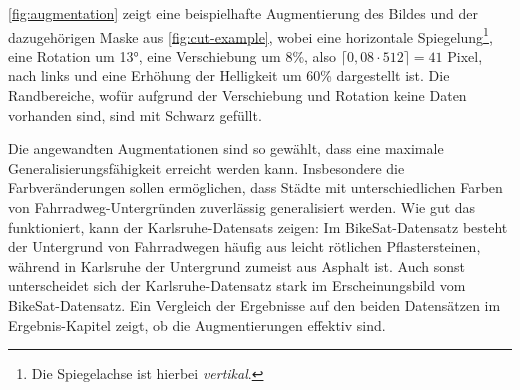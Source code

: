 \autoref{fig:augmentation} zeigt eine beispielhafte Augmentierung des Bildes und der dazugehörigen Maske aus \autoref{fig:cut-example},
wobei eine horizontale Spiegelung\footnote{Die Spiegelachse ist hierbei \textit{vertikal}.},
eine Rotation um 13°, eine Verschiebung um 8\%, also $\lceil 0,08 \cdot 512 \rceil = 41$ Pixel,
nach links und eine Erhöhung der Helligkeit um 60\% dargestellt ist. 
Die Randbereiche, wofür aufgrund der Verschiebung und Rotation keine Daten vorhanden sind, sind mit Schwarz gefüllt. 

Die angewandten Augmentationen sind so gewählt, dass eine maximale Generalisierungsfähigkeit erreicht werden kann. 
Insbesondere die Farbveränderungen sollen ermöglichen, dass Städte mit unterschiedlichen Farben von Fahrradweg-Untergründen 
zuverlässig generalisiert werden. Wie gut das funktioniert, kann der Karlsruhe-Datensats zeigen: Im BikeSat-Datensatz 
besteht der Untergrund von Fahrradwegen häufig aus leicht rötlichen Pflastersteinen, während in Karlsruhe der Untergrund zumeist 
aus Asphalt ist.   
Auch sonst unterscheidet sich der Karlsruhe-Datensatz stark im Erscheinungsbild vom BikeSat-Datensatz. 
Ein Vergleich der Ergebnisse auf den beiden Datensätzen im Ergebnis-Kapitel zeigt, ob die Augmentierungen effektiv sind. 

